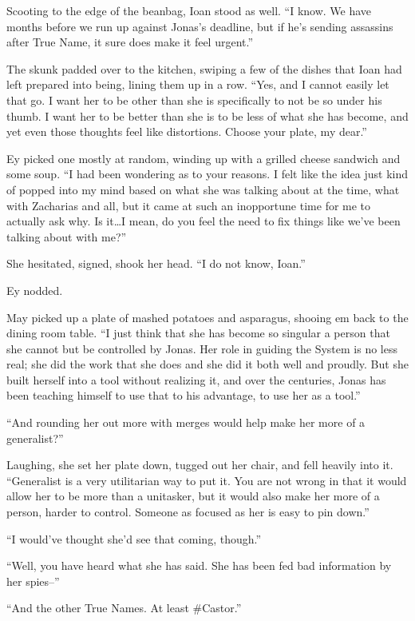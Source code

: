 Scooting to the edge of the beanbag, Ioan stood as well. ``I know. We have months before we run up against Jonas's deadline, but if he's sending assassins after True Name, it sure does make it feel urgent.''

The skunk padded over to the kitchen, swiping a few of the dishes that Ioan had left prepared into being, lining them up in a row. ``Yes, and I cannot easily let that go. I want her to be other than she is specifically to not be so under his thumb. I want her to be better than she is to be less of what she has become, and yet even those thoughts feel like distortions. Choose your plate, my dear.''

Ey picked one mostly at random, winding up with a grilled cheese sandwich and some soup. ``I had been wondering as to your reasons. I felt like the idea just kind of popped into my mind based on what she was talking about at the time, what with Zacharias and all, but it came at such an inopportune time for me to actually ask why. Is it\ldots I mean, do you feel the need to fix things like we've been talking about with me?''

She hesitated, signed, shook her head. ``I do not know, Ioan.''

Ey nodded.

May picked up a plate of mashed potatoes and asparagus, shooing em back to the dining room table. ``I just think that she has become so singular a person that she cannot but be controlled by Jonas. Her role in guiding the System is no less real; she did the work that she does and she did it both well and proudly. But she built herself into a tool without realizing it, and over the centuries, Jonas has been teaching himself to use that to his advantage, to use her as a tool.''

``And rounding her out more with merges would help make her more of a generalist?''

Laughing, she set her plate down, tugged out her chair, and fell heavily into it. ``Generalist is a very utilitarian way to put it. You are not wrong in that it would allow her to be more than a unitasker, but it would also make her more of a person, harder to control. Someone as focused as her is easy to pin down.''

``I would've thought she'd see that coming, though.''

``Well, you have heard what she has said. She has been fed bad information by her spies--''

``And the other True Names. At least \#Castor.''

